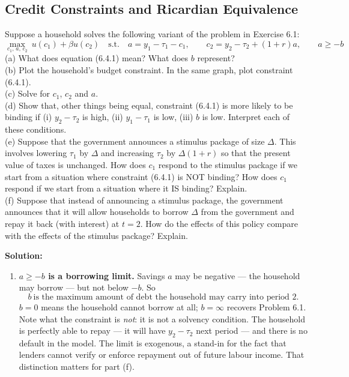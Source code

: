 \documentclass[12pt, letterpaper]{article}
\begin{document}
\subsection{Credit Constraints and Ricardian Equivalence}

\begin{tcolorbox}[oddbox,title={Problem 6.5 \quad Credit Constraints and Ricardian Equivalence}]
\begin{tcolorbox}[questionbox]
Suppose a household solves the following variant of the problem in Exercise 6.1:
\[
\max_{c_1,\,a,\,c_2}\ u(c_1)+\beta u(c_2)
\quad\text{s.t.}\quad
a=y_1-\tau_1-c_1,
\qquad
c_2=y_2-\tau_2+(1+r)a,
\qquad
a\ge-b
\tag{6.4.1}
\]
(a) What does equation (6.4.1) mean? What does $b$ represent?\\[3pt]
(b) Plot the household's budget constraint. In the same graph, plot constraint
(6.4.1).\\[3pt]
(c) Solve for $c_1$, $c_2$ and $a$.\\[3pt]
(d) Show that, other things being equal, constraint (6.4.1) is more likely to be binding if
(i) $y_2-\tau_2$ is high, (ii) $y_1-\tau_1$ is low, (iii) $b$ is low. Interpret each of these
conditions.\\[3pt]
(e) Suppose that the government announces a stimulus package of size $\Delta$. This involves
lowering $\tau_1$ by $\Delta$ and increasing $\tau_2$ by $\Delta(1+r)$ so that the present
value of taxes is unchanged. How does $c_1$ respond to the stimulus package if we start from
a situation where constraint (6.4.1) is NOT binding? How does $c_1$ respond if we start from
a situation where it IS binding? Explain.\\[3pt]
(f) Suppose that instead of announcing a stimulus package, the government announces that it
will allow households to borrow $\Delta$ from the government and repay it back (with
interest) at $t=2$. How do the effects of this policy compare with the effects of the
stimulus package? Explain.
\end{tcolorbox}

\textbf{Solution:}
\begin{enumerate}

\item \textbf{$a\ge-b$ is a borrowing limit.} Savings $a$ may be negative --- the household
may borrow --- but not below $-b$. So
\[
\boxed{b\ \text{is the maximum amount of debt the household may carry into period 2.}}
\]
$b=0$ means the household cannot borrow at all; $b=\infty$ recovers Problem 6.1. Note what
the constraint is \emph{not}: it is not a solvency condition. The household is perfectly able
to repay --- it will have $y_2-\tau_2$ next period --- and there is no default in the model.
The limit is exogenous, a stand-in for the fact that lenders cannot verify or enforce
repayment out of future labour income. That distinction matters for part (f).


\end{enumerate}
\end{tcolorbox}
\end{document}
